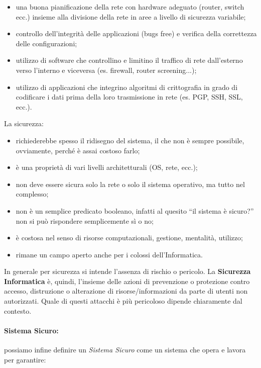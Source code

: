 \begin{itemize}
      \item una buona pianificazione della rete con hardware adeguato
            (router, switch ecc.) insieme alla divisione della rete in aree a livello
            di sicurezza variabile;
      \item controllo dell'integrità delle applicazioni (bugs free) e verifica
            della correttezza delle configurazioni;
      \item utilizzo di software che controllino e limitino il traffico di rete
            dall'esterno verso l'interno e viceversa (es. firewall, router screening...);
      \item utilizzo di applicazioni che integrino algoritmi di crittografia in
            grado di codificare i dati prima della loro trasmissione in rete
            (es. PGP, SSH, SSL, ecc.).
\end{itemize}

La sicurezza:

\begin{itemize}
      \item richiederebbe spesso il ridisegno del sistema, il che non è sempre
            possibile, ovviamente, perché è assai costoso farlo;
      \item è una proprietà di vari livelli architetturali (OS, rete, ecc.);
      \item non deve essere sicura solo la rete o solo il sistema operativo,
            ma tutto nel complesso;
      \item non è un semplice predicato booleano, infatti al quesito
            ``il sistema è sicuro?'' non si può
            rispondere semplicemente sì o no;
      \item è costosa nel senso di risorse computazionali, gestione, mentalità, utilizzo;
      \item rimane un campo aperto anche per i colossi dell'Informatica.
\end{itemize}

In generale per sicurezza si intende l'assenza di rischio o pericolo.
La \textbf{Sicurezza Informatica} è, quindi, l'insieme delle azioni di prevenzione
o protezione contro accesso, distruzione o alterazione di risorse/informazioni
da parte di utenti non autorizzati. Quale di questi attacchi è più pericoloso
dipende chiaramente dal contesto.

\paragraph{Sistema Sicuro:} possiamo infine definire un \textit{Sistema Sicuro}
come un sistema che opera e lavora per garantire:


